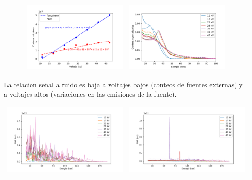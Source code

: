 \documentclass{sciposter}
\begin{document}
\begin{multicols}{3}
	\begin{figure}[h]
		\centering
		\begin{tabular}{cc}
				\includegraphics[width = 0.52\linewidth]{Figuras/Max_voltage.pdf}
				&
				\includegraphics[width = 0.52\linewidth]{Figuras/Both_Normed.pdf}
		\end{tabular}
	\end{figure}
	
	La relación señal a ruido es baja a voltajes bajos (conteos de fuentes externas) y a voltajes altos (variaciones en las emisiones de la fuente).
	
	\begin{table}[h]
		\centering
		\begin{tabular}{cc}
			\includegraphics[width = 0.52\linewidth]{Figuras/wsnr.pdf}
			&
			\includegraphics[width = 0.52\linewidth]{Figuras/agsnr.pdf}
		\end{tabular}
	\end{table}
	

\end{multicols}
\end{document}
